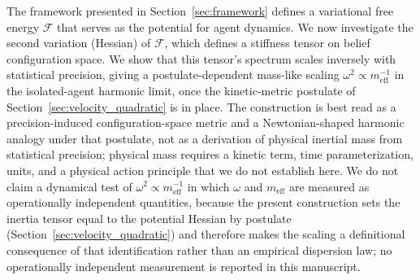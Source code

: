 \documentclass[11pt]{article}
\begin{document}
The framework presented in Section~\ref{sec:framework} defines a variational free energy $\mathcal{F}$ that serves as the potential for agent dynamics. We now investigate the second variation (Hessian) of $\mathcal{F}$, which defines a stiffness tensor on belief configuration space. We show that this tensor's spectrum scales inversely with statistical precision, giving a postulate-dependent mass-like scaling $\omega^2 \propto m_{\text{eff}}^{-1}$ in the isolated-agent harmonic limit, once the kinetic-metric postulate of Section~\ref{sec:velocity_quadratic} is in place. The construction is best read as a precision-induced configuration-space metric and a Newtonian-shaped harmonic analogy under that postulate, not as a derivation of physical inertial mass from statistical precision; physical mass requires a kinetic term, time parameterization, units, and a physical action principle that we do not establish here. We do not claim a dynamical test of $\omega^2 \propto m_{\text{eff}}^{-1}$ in which $\omega$ and $m_{\text{eff}}$ are measured as operationally independent quantities, because the present construction sets the inertia tensor equal to the potential Hessian by postulate (Section~\ref{sec:velocity_quadratic}) and therefore makes the scaling a definitional consequence of that identification rather than an empirical dispersion law; no operationally independent measurement is reported in this manuscript.
\end{document}
